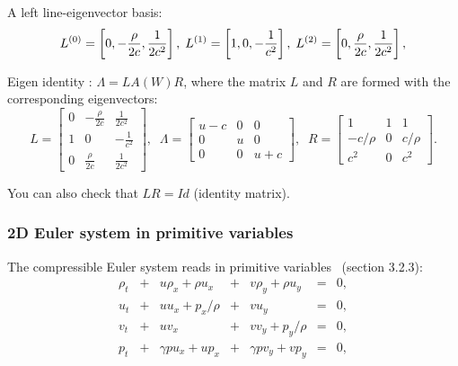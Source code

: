 \documentclass{article}
\begin{document}
A left line-eigenvector basis:
\begin{equation}
  L^{(0)}=\left[0, -\frac{\rho}{2c}, \frac{1}{2c^2}\right],\;\;\\
  L^{(1)}=\left[1, 0, -\frac{1}{c^2} \right],\;\;\\
  L^{(2)}=\left[0, \frac{\rho}{2c}, \frac{1}{2c^2}\right],
\end{equation}

Eigen identity : $\Lambda = L A(W) R$, where the matrix $L$ and $R$ are formed with the corresponding eigenvectors:
\begin{equation}
  L = \left[
    \begin{array}{ccc}
      0 & -\frac{\rho}{2c} & \frac{1}{2c^2}\\
      1 & 0 & -\frac{1}{c^2}\\
      0 & \frac{\rho}{2c} & \frac{1}{2c^2}
    \end{array}
  \right],\;\;
  \Lambda = \left[
    \begin{array}{ccc}
      u-c& 0 & 0\\
      0  & u & 0\\
      0  & 0 & u+c
    \end{array}
  \right],\;\;
  R = \left[
    \begin{array}{ccc}
      1 & 1 & 1\\
      -c/\rho & 0 & c/\rho\\
      c^2 & 0 & c^2
    \end{array}
  \right].
\end{equation}

You can also check that $L R = Id$ (identity matrix).

\subsubsection*{2D Euler system in primitive variables}
The compressible Euler system reads in primitive variables~\cite{toro} (section 3.2.3):\\

\begin{equation}
  \begin{array}{ccccccc}
    \rho_t & + & u\rho_x+\rho u_x & + & v\rho_y+\rho u_y & = &0,\\
    u_t    & + & u u_x + p_x/\rho & + & v u_y            & = &0,\\
    v_t    & + & u v_x            & + & v v_y + p_y/\rho & = &0,\\
    p_t    & + & \gamma p u_x + u p_x & + & \gamma p v_y + v p_y & = &0,
  \end{array}
\end{equation}
\end{document}
